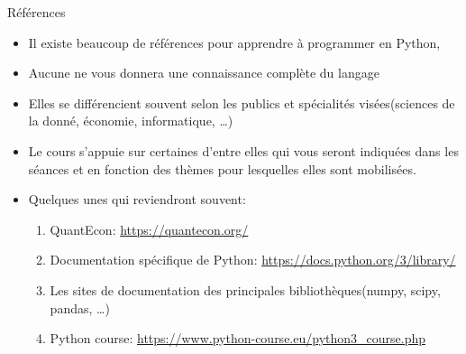 \begin{frame}[allowframebreaks]{Références}
    \begin{itemize}
        \item Il existe beaucoup de références pour apprendre à programmer en Python,
        \item Aucune ne vous donnera une connaissance complète du langage
        \item Elles se différencient souvent selon les publics et spécialités
         visées(sciences de la donné, économie, informatique, \ldots)
        \item Le cours s'appuie sur certaines d'entre elles qui vous seront indiquées dans les séances 
        et en fonction des thèmes pour lesquelles elles sont mobilisées. 
        \framebreak
        \item Quelques unes qui reviendront souvent:
        \begin{enumerate}
            \item QuantEcon: \url{https://quantecon.org/}
            \item Documentation spécifique de Python: \url{https://docs.python.org/3/library/}
            \item Les sites de documentation des principales bibliothèques(numpy, scipy, pandas, \ldots)
            \item Python course: \url{https://www.python-course.eu/python3_course.php}
        \end{enumerate}
    \end{itemize}
\end{frame}
%
%


